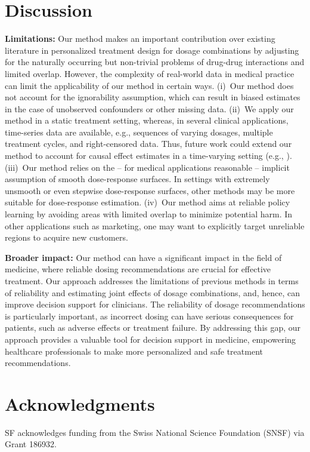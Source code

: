 \documentclass{article}
\theoremstyle{definition}
\theoremstyle{plain}
\begin{document}
\section{Discussion}

\textbf{Limitations:} Our method makes an important contribution over existing literature in personalized treatment design for dosage combinations by adjusting for the naturally occurring but non-trivial problems of drug-drug interactions and limited overlap. However, the complexity of real-world data in medical practice can limit the applicability of our method in certain ways. (i)~Our method does not account for the ignorability assumption, which can result in biased estimates in the case of unobserved confounders or other missing data. (ii)~We apply our method in a static treatment setting, whereas, in several clinical applications, time-series data are available, e.g., sequences of varying dosages, multiple treatment cycles, and right-censored data. Thus, future work could extend our method to account for causal effect estimates in a time-varying setting (e.g., \cite{Frauen.2023, hess2023bayesian, Melnychuk.2022}). (iii)~Our method relies on the -- for medical applications reasonable -- implicit assumption of smooth dose-response surfaces. In settings with extremely unsmooth or even stepwise dose-response surfaces, other methods may be more suitable for dose-response estimation. (iv)~Our method aims at reliable policy learning by avoiding areas with limited overlap to minimize potential harm. In other applications such as marketing, one may want to explicitly target unreliable regions to acquire new customers.

\textbf{Broader impact:} Our method can have a significant impact in the field of medicine, where reliable dosing recommendations are crucial for effective treatment. Our approach addresses the limitations of previous methods in terms of reliability and estimating joint effects of dosage combinations, and, hence, can improve decision support for clinicians. The reliability of dosage recommendations is particularly important, as incorrect dosing can have serious consequences for patients, such as adverse effects or treatment failure. By addressing this gap, our approach provides a valuable tool for decision support in medicine, empowering healthcare professionals to make more personalized and safe treatment recommendations.

\newpage

\section*{Acknowledgments}
SF acknowledges funding from the Swiss National Science Foundation (SNSF) via Grant 186932.

\printbibliography


\end{document}
